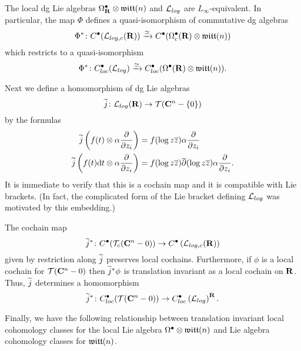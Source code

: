 \documentclass[11pt]{amsart}
\begin{document}
\begin{prop}
The local dg Lie algebras $\Omega^\bullet_{\mathbf{R}} \otimes \mathfrak{witt}(n)$ and $\mathcal L_{log}$ are $L_\infty$-equivalent.
In particular, the map $\Phi$ defines a quasi-isomorphism of commutative dg algebras
\begin{equation}
\Phi^* \colon C^\bullet(\mathcal L_{log,c}(\mathbf{R})) \xrightarrow{\simeq} C^\bullet(\Omega^{\bullet}_c(\mathbf{R}) \otimes \mathfrak{witt}(n))
\end{equation}
which restricts to a quasi-isomorphism
\begin{equation}
\Phi^* \colon C_{loc}^\bullet(\mathcal L_{log}) \xrightarrow{\simeq} C_{loc}^\bullet(\Omega^\bullet(\mathbf{R}) \otimes \mathfrak{witt}(n)) .
\end{equation}
\end{prop}

Next we define a homomorphism of dg Lie algebras
\begin{equation}
\widetilde j \colon \mathcal L_{log}(\mathbf{R}) \to \mathcal T(\mathbf{C}^n - \{0\})
\end{equation}
by the formulas
\begin{align*}
\widetilde j \left(f(t) \otimes \alpha \frac{\partial}{\partial z_i}\right) & = f(\log z {\overline{z}}) \alpha \frac{\partial}{\partial z_i} \\
\widetilde j \left(f(t) {\rm d} t \otimes \alpha \frac{\partial}{\partial z_i}\right) & = f(\log z {\overline{z}}) \overline{\partial} (\log z {\overline{z}} )\alpha \frac{\partial}{\partial z_i} .
\end{align*}
It is immediate to verify that this is a cochain map and it is compatible with Lie brackets. (In fact, the complicated form of the Lie bracket defining $\mathcal L_{log}$ was motivated by this embedding.)

\begin{lem}
The cochain map
\begin{equation}
\widetilde j^* \colon C^\bullet (\mathcal T_c(\mathbf{C}^n - 0)) \to C^\bullet \left(\mathcal L_{log,c}(\mathbf{R}) \right)
\end{equation}
given by restriction along $\widetilde j$ preserves local cochains. 
Furthermore, if $\phi$ is a local cochain for $\mathcal T(\mathbf{C}^n - 0)$ then $\widetilde j^* \phi$ is translation invariant as a local cochain on $\mathbf{R}$. 
Thus, $\widetilde j$ determines a homomorphism
\begin{equation}
\widetilde j^* \colon C^\bullet_{loc}(\mathcal T(\mathbf{C}^n-0)) \to C^\bullet_{loc}\left(\mathcal L_{log}\right)^{\mathbf{R}} .
\end{equation}
\end{lem}

Finally, we have the following relationship between translation invariant local cohomology classes for the local Lie algebra $\Omega^\bullet \otimes \mathfrak{witt}(n)$ and Lie algebra cohomology classes for $\mathfrak{witt}(n)$.
\end{document}
